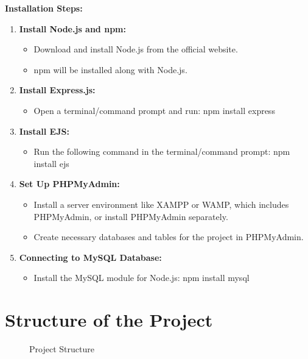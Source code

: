 \documentclass[12pt,a4paper]{report}
\begin{document}
\textbf{Installation Steps:}
\begin{enumerate}
    \item \textbf{Install Node.js and npm:}
    \begin{itemize}
        \item Download and install Node.js from the official website.
        \item npm will be installed along with Node.js.
    \end{itemize}

    \item \textbf{Install Express.js:}
    \begin{itemize}
        \item Open a terminal/command prompt and
        run: npm install express
    \end{itemize}

    \item \textbf{Install EJS:}
    \begin{itemize}
        \item Run the following command in the terminal/command prompt:
        npm install ejs
    \end{itemize}

    \item \textbf{Set Up PHPMyAdmin:}
    \begin{itemize}
        \item Install a server environment like XAMPP or WAMP, which
        includes PHPMyAdmin, or install PHPMyAdmin separately.
        \item Create necessary databases and tables for the project in PHPMyAdmin.
    \end{itemize}

    \item \textbf{Connecting to MySQL Database:}
    \begin{itemize}
        \item Install the MySQL module for Node.js:
        npm install mysql
    \end{itemize}
\end{enumerate}

\chapter{Structure of the Project}

\begin{figure}[h]
    \centering
    \caption{Project Structure}
\end{figure}
\end{document}
